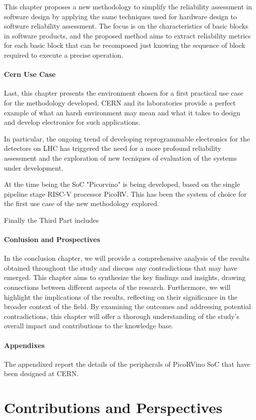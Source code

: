 \documentclass[./dissertation.tex]{subfiles}
\begin{document}
This chapter proposes a new methodology to simplify the reliability assessment in software design by applying the same techniques used for hardware design to software reliability assessment. The focus is on the characteristics of basic blocks in software products, and the proposed method aims to extract reliability metrics for each basic block that can be recomposed just knowing the sequence of block required to execute a precise operation.
\paragraph{Cern Use Case}
Last, this chapter presents the environment chosen for a first practical use case for the methodology developed. CERN and its laboratories provide a perfect example of what an harsh environment may mean and what it takes to design and develop electronics for such applications.

In particular, the ongoing trend of developing reprogrammable electronics for the detectors on LHC has triggered the need for a more profound reliability assessment and the exploration of new tecniques of evaluation of the systems under development.

At the time being the SoC "Picorvino" is being developed, based on the single pipeline stage RISC-V processor PicoRV. This has been the system of choice for the first use case of the new methodology explored.

Finally the Third Part includes
\paragraph{Conlusion and Prospectives}
In the conclusion chapter, we will provide a comprehensive analysis of the results obtained throughout the study and discuss any contradictions that may have emerged. This chapter aims to synthesize the key findings and insights, drawing connections between different aspects of the research. Furthermore, we will highlight the implications of the results, reflecting on their significance in the broader context of the field. By examining the outcomes and addressing potential contradictions, this chapter will offer a thorough understanding of the study's overall impact and contributions to the knowledge base.

\paragraph{Appendixes}
The appendixed report the details of the peripherals of PicoRVino SoC that have been designed at CERN.


\section{Contributions and Perspectives}

\newpage
\newpage	
\end{document}
